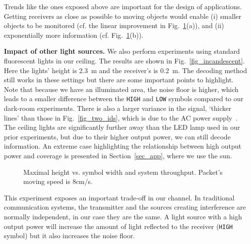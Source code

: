 \documentclass[10pt]{sig-alternate-05-2015}
\begin{document}
Trends like the ones exposed above are important for the design of applications. Getting receivers as close as possible to moving objects would enable 
(i) smaller objects to be monitored (cf. the linear improvement in Fig.~\ref{fig_height_vs_width}(a)), and (ii) exponentially more information (cf. Fig.~\ref{fig_height_vs_width}(b)).

{\bf Impact of other light sources.} We also perform experiments using standard fluorescent lights in our ceiling. The results are shown in Fig.~\ref{fig_incandescent}. Here the lights' height is 2.3~m and the receiver's is 0.2~m.
The decoding method still works in these settings but there are some important points to highlight.
Note that because we have an illuminated area, the noise floor is higher, which leads to a smaller difference between the \texttt{HIGH} and \texttt{LOW} symbols compared to our dark-room experiments. There is also a larger variance in the signal, `thicker lines' than those in Fig.~\ref{fig_two_ids}, which is due to the AC power supply~\cite{Kuo2014VLCS}. The ceiling lights are significantly further away than the LED lamp used in our prior experiments, but due to their higher output power, we can still decode information. An extreme case highlighting the relationship between high output power and coverage is presented in Section~\ref{sec_app}, where we use the sun.

\begin{figure}[!t]
	\hfill {}
	\vspace{-2mm}
	\caption {Maximal height vs. symbol width and system \newline throughput. Packet's moving speed is 8cm/s.}
	\vspace{-3mm}
	\label{fig_height_vs_width}
\end{figure}

This experiment exposes an important trade-off in our channel. In traditional communication systems, the transmitter and the sources creating interference are normally independent, in our case they are the same. A light source with a high output power will increase the amount of light reflected to the receiver (\texttt{HIGH} symbol) but it also increases the noise floor.
\end{document}
